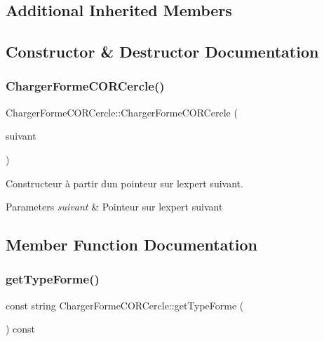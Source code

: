 \subsection*{Additional Inherited Members}


\subsection{Constructor \& Destructor Documentation}
\mbox{\label{class_charger_forme_c_o_r_cercle_aa014ab64f0a6c59c9e6d0148ec889e23}} 
\subsubsection{\texorpdfstring{Charger\+Forme\+C\+O\+R\+Cercle()}{ChargerFormeCORCercle()}}
{\footnotesize\ttfamily Charger\+Forme\+C\+O\+R\+Cercle\+::\+Charger\+Forme\+C\+O\+R\+Cercle (\begin{DoxyParamCaption}\item[{\hyperlink{class_charger_forme_c_o_r}{Charger\+Forme\+C\+OR} $\ast$}]{suivant }\end{DoxyParamCaption})}



Constructeur à partir d\textquotesingle{}un pointeur sur l\textquotesingle{}expert suivant. 


\begin{DoxyParams}{Parameters}
{\em suivant} & Pointeur sur l\textquotesingle{}expert suivant \\
\hline
\end{DoxyParams}


\subsection{Member Function Documentation}
\mbox{\label{class_charger_forme_c_o_r_cercle_a4ca5a036a26641c2636d376f51659172}} 
\subsubsection{\texorpdfstring{get\+Type\+Forme()}{getTypeForme()}}
{\footnotesize\ttfamily const string Charger\+Forme\+C\+O\+R\+Cercle\+::get\+Type\+Forme (\begin{DoxyParamCaption}{ }\end{DoxyParamCaption}) const\hspace{0.3cm}{\ttfamily [virtual]}}



